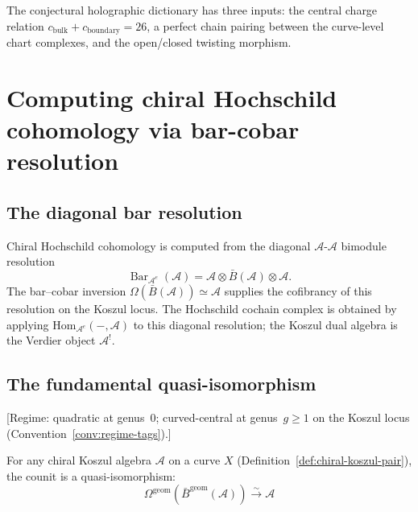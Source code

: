 The conjectural holographic dictionary has three inputs: the central
charge relation $c_{\mathrm{bulk}}+c_{\mathrm{boundary}}=26$, a perfect
chain pairing between the curve-level chart complexes, and the
open/closed twisting morphism.

\section{Computing chiral Hochschild cohomology via bar-cobar resolution}
\label{sec:hochschild-via-bar-cobar-complete}

\subsection{The diagonal bar resolution}

Chiral Hochschild cohomology is computed from the diagonal
$\mathcal A$-$\mathcal A$ bimodule resolution
\[
\operatorname{Bar}_{\mathcal A^e}(\mathcal A)
=
\mathcal A\otimes\bar B(\mathcal A)\otimes\mathcal A.
\]
The bar--cobar inversion
$\Omega(\bar B(\mathcal A))\simeq\mathcal A$ supplies the
cofibrancy of this resolution on the Koszul locus. The Hochschild
cochain complex is obtained by applying
$\mathrm{Hom}_{\mathcal A^e}(-,\mathcal A)$ to this diagonal
resolution; the Koszul dual algebra is the Verdier object
$\mathcal A^!$.

\subsection{The fundamental quasi-isomorphism}

\begin{theorem}\label{thm:bar-cobar-resolution}
\textup{[Regime: quadratic at genus~$0$; curved-central at genus~$g \geq 1$
on the Koszul locus
\textup{(}Convention~\textup{\ref{conv:regime-tags})}.]}

For any chiral Koszul algebra $\mathcal{A}$ on a curve $X$
\textup{(}Definition~\textup{\ref{def:chiral-koszul-pair})},
the counit is a quasi-isomorphism:
\[\Omega^{\text{geom}}(\bar{B}^{\text{geom}}(\mathcal{A})) \xrightarrow{\sim} \mathcal{A}\]
\end{theorem}

